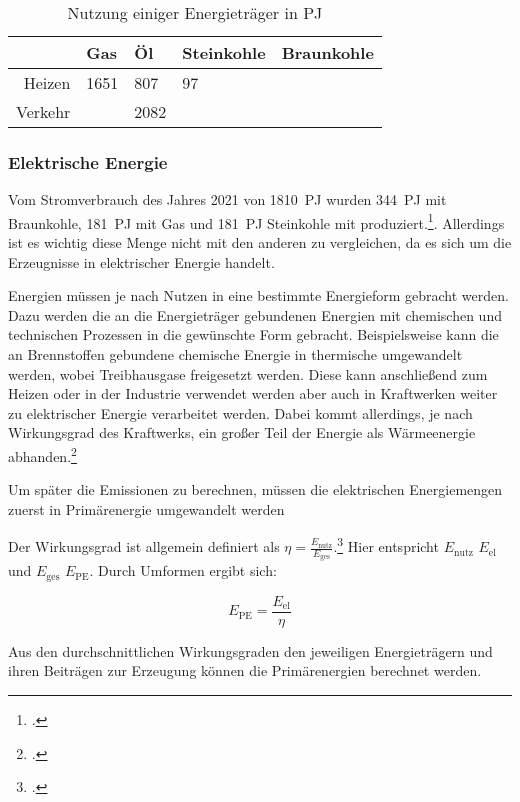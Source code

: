 \documentclass[12pt, ngerman]{article}
\newcommand{\pe}{_{\mathrm{PE}}}
\newcommand{\el}{_{\mathrm{el}}}
\begin{document}
\begin{table}[!h]
    \centering
    \begin{tabular}{r|llll}
        \toprule
                & Gas  & Öl   & Steinkohle & Braunkohle \\
        \midrule
        Heizen  & 1651 & 807  & 97         &            \\
        Verkehr &      & 2082 &            &            \\
        \bottomrule
    \end{tabular}
    \caption{Nutzung einiger Energieträger in \unit{PJ\pe}}
\end{table}

\subsubsection{Elektrische Energie}

Vom Stromverbrauch des Jahres 2021 von \qty{1810}{PJ\el} wurden \qty{344}{PJ\el} mit Braunkohle, \qty{181}{PJ\el} mit Gas
und \qty{181}{PJ\el} Steinkohle mit produziert.\footcite{SMARDEntwicklungenIm}.
Allerdings ist es wichtig diese Menge nicht mit den anderen zu vergleichen, da es sich
um die Erzeugnisse in elektrischer Energie handelt.

Energien müssen je nach Nutzen in eine bestimmte Energieform gebracht werden.
Dazu werden die an die Energieträger gebundenen Energien mit chemischen und technischen
Prozessen in die gewünschte Form gebracht.
Beispielsweise kann die an Brennstoffen gebundene chemische Energie
in thermische umgewandelt werden, wobei Treibhausgase freigesetzt werden.
Diese kann anschließend zum Heizen oder in der Industrie verwendet werden
aber auch in Kraftwerken weiter zu elektrischer Energie verarbeitet werden.
Dabei kommt allerdings, je nach Wirkungsgrad des Kraftwerks,
ein großer Teil der Energie als Wärmeenergie abhanden.\footcite{AachenHatEnergie}

Um später die Emissionen zu berechnen, müssen die elektrischen Energiemengen zuerst in
Primärenergie umgewandelt werden

Der Wirkungsgrad \unit{\eta} ist allgemein definiert als
\(\eta=\frac{E_{\mathrm{nutz}}}{E_{\mathrm{ges}}}\).\footcite{WirkungsgradLEIFIphysik}
Hier entspricht \(E\mathrm{_{nutz}}\) \(E\el\) und \(E_\mathrm{{ges}}\) \(E\pe\). Durch Umformen ergibt sich:

\[E\pe=\frac{E\el}{\eta}\]

Aus den durchschnittlichen Wirkungsgraden den jeweiligen Energieträgern und ihren Beiträgen
zur Erzeugung können die Primärenergien berechnet werden.
\end{document}
